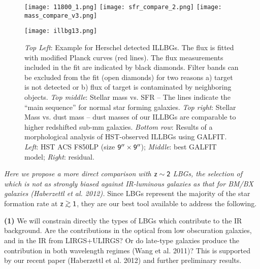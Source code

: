 \documentclass[12pt]{article}
\begin{document}
\begin{figure}[htbp]
\vspace*{-10mm}
\texttt{[image: 11800\_1.png]}
\hspace{0.1in} 
\texttt{[image: sfr\_compare\_2.png]}
\hspace{-0.1in} 
\texttt{[image: mass\_compare\_v3.png]}


\hspace{0.1in}
\texttt{[image: illbg13.png]}
\caption{{\it Top Left}: Example for Herschel detected ILLBGs. The flux is
  fitted with modified Planck curves (red lines). The flux
  measurements included in the fit are indicated by black
  diamonds. Filter bands can be excluded from the fit (open diamonds)
  for two reasons a) target is not detected or b) flux of target is
  contaminated by neighboring objects. {\it Top middle}: Stellar
  mass vs. SFR -- The lines indicate the ``main sequence'' for normal star
  forming galaxies. {\it Top right}: Stellar Mass vs. dust mass --
  dust masses 
  of our ILLBGs are comparable to higher redshifted sub-mm
  galaxies. {\it Bottom row}: Results of a
  morphological analysis of HST-observed ILLBGs using GALFIT. {\it Left}:
  HST ACS F850LP (size $\sf 9^{\prime\prime}\times 9^{\prime\prime}$);
  {\it Middle}: best GALFIT model; {\it Right}: residual.}
\end{figure}

{\it Here we propose a more direct comparison with
  $\sf z\sim 2$ LBGs, the selection of which is not as strongly biased
  against IR-luminous galaxies as that for BM/BX galaxies (Haberzettl
  et al. 2012).}
Since LBGs represent the majority of the star formation rate at
$\sf z\simgt1$, they are our best tool available to address the following.

\hspace{0.1in}
{\bf (1)} We will constrain directly the types of
LBGs which contribute to the IR background. Are the contributions
in the optical from low obscuration galaxies, and in the IR from
LIRGS+ULIRGS?  Or do late-type galaxies produce the contribution
in both wavelength regimes (Wang et al. 2011)? This is
supported by our recent paper (Haberzettl et
al. 2012) and further preliminary results.
\end{document}
